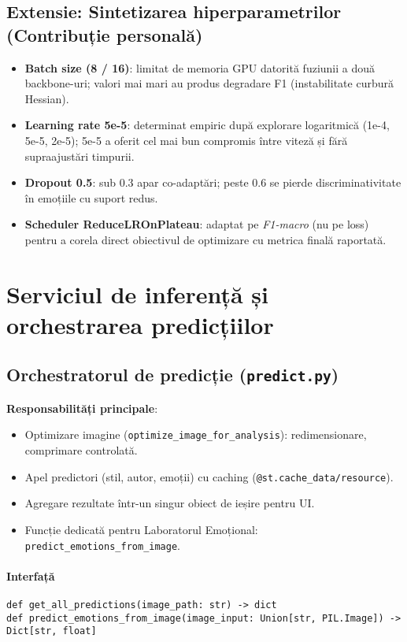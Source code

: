 \subsection*{Extensie: Sintetizarea hiperparametrilor (Contribuție personală)}
\begin{itemize}
  \item \textbf{Batch size (8 / 16)}: limitat de memoria GPU datorită fuziunii a două backbone-uri; valori mai mari au produs degradare F1 (instabilitate curbură Hessian).
  \item \textbf{Learning rate 5e-5}: determinat empiric după explorare logaritmică (1e-4, 5e-5, 2e-5); 5e-5 a oferit cel mai bun compromis între viteză și fără supraajustări timpurii.
  \item \textbf{Dropout 0.5}: sub 0.3 apar co-adaptări; peste 0.6 se pierde discriminativitate în emoțiile cu suport redus.
  \item \textbf{Scheduler ReduceLROnPlateau}: adaptat pe \emph{F1-macro} (nu pe loss) pentru a corela direct obiectivul de optimizare cu metrica finală raportată.
\end{itemize}

\section{Serviciul de inferență și orchestrarea predicțiilor}\label{sec:inference}

\subsection{Orchestratorul de predicție (\texttt{predict.py})}
\textbf{Responsabilități principale}:
\begin{itemize}
  \item Optimizare imagine (\texttt{optimize\_image\_for\_analysis}): redimensionare, comprimare controlată.
  \item Apel predictori (stil, autor, emoții) cu caching (\texttt{@st.cache\_data/resource}).
  \item Agregare rezultate într-un singur obiect de ieșire pentru UI.
  \item Funcție dedicată pentru Laboratorul Emoțional: \texttt{predict\_emotions\_from\_image}.
\end{itemize}

\paragraph{Interfață}
\begin{verbatim}
def get_all_predictions(image_path: str) -> dict
def predict_emotions_from_image(image_input: Union[str, PIL.Image]) -> Dict[str, float]
\end{verbatim}


